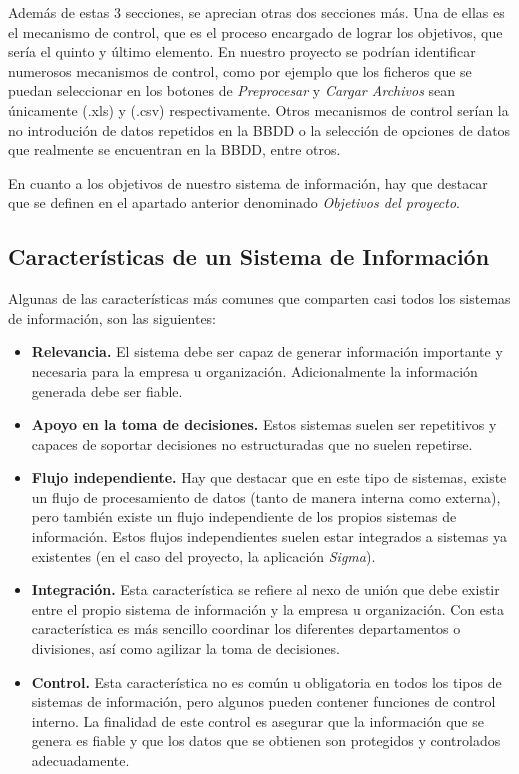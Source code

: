 Además de estas 3 secciones, se aprecian otras dos secciones más. Una de ellas es el mecanismo de control, que es el proceso encargado de lograr los objetivos, que sería el quinto y último elemento.
En nuestro proyecto se podrían identificar numerosos mecanismos de control, como por ejemplo que los ficheros que se puedan seleccionar en los botones de \emph{Preprocesar} y \emph{Cargar Archivos} sean únicamente (.xls) y (.csv) respectivamente. Otros mecanismos de control serían la no introdución de datos repetidos en la BBDD o la selección de opciones de datos que realmente se encuentran en la BBDD, entre otros.

En cuanto a los objetivos de nuestro sistema de información, hay que destacar que se definen en el apartado anterior denominado \emph{Objetivos del proyecto}.


\subsection{Características de un Sistema de Información}

Algunas de las características más comunes que comparten casi todos los sistemas de información, son las siguientes:

\begin{itemize}
\item \textbf{Relevancia.} El sistema debe ser capaz de generar información importante y necesaria para la empresa u organización. Adicionalmente la información generada debe ser fiable\cite{estrategia}.
\item \textbf{Apoyo en la toma de decisiones.} Estos sistemas suelen ser repetitivos y capaces de soportar decisiones no estructuradas que no suelen repetirse.
\item \textbf{Flujo independiente.} Hay que destacar que en este tipo de sistemas, existe un flujo de procesamiento de datos (tanto de manera interna como externa), pero también existe un flujo independiente de los propios sistemas de información.
Estos flujos independientes suelen estar integrados a sistemas ya existentes (en el caso del proyecto, la aplicación \emph{Sigma}).
\item \textbf{Integración.} Esta característica se refiere al nexo de unión que debe existir entre el propio sistema de información y la empresa u organización. Con esta característica es más sencillo coordinar los diferentes departamentos o   divisiones, así como agilizar la toma de decisiones\cite{caracteristicas}.
\item \textbf{Control.} Esta característica no es común u obligatoria en todos los tipos de sistemas de información, pero algunos pueden contener funciones de control interno. La finalidad de este control es asegurar que la información que se genera es fiable y que los datos que se obtienen son protegidos y controlados adecuadamente.
\end{itemize}


